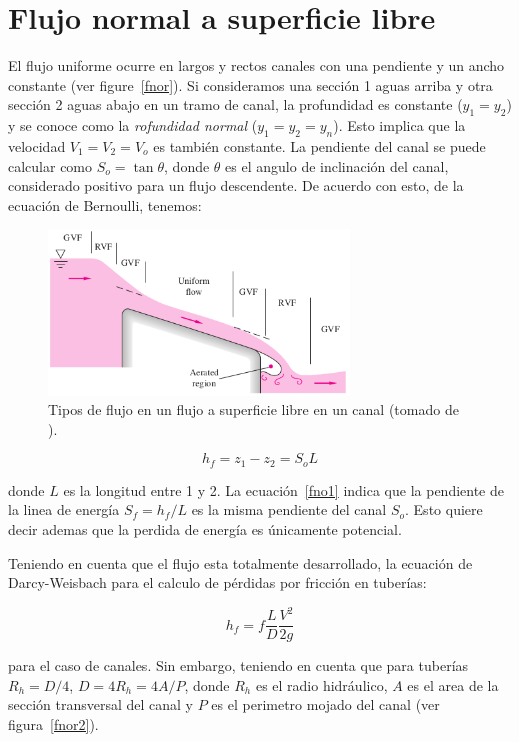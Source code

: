 \documentclass[11pt, oneside]{article}
\begin{document}
\section{Flujo normal a superficie libre}
El flujo uniforme ocurre en largos y rectos canales con una pendiente y un ancho constante (ver figure~\ref{fnor}). Si consideramos una secci\'on 1 aguas arriba y otra secci\'on 2 aguas abajo en un tramo de canal, la profundidad es constante ($y_1 = y_2$) y se conoce como la \emph{rofundidad normal} ($y_1 = y_2 = y_n$). Esto implica que la velocidad $V_1 = V_2 = V_o$ es tambi\'en constante. La pendiente del canal se puede calcular como $S_o = \tan \theta$, donde $\theta$ es el angulo de inclinaci\'on del canal, considerado positivo para un flujo descendente. De acuerdo con esto, de la ecuaci\'on de Bernoulli, tenemos:

\begin{figure}[h]
\centering
\includegraphics[width=8cm]{fnor1.png}
\caption{Tipos de flujo en un flujo a superficie libre en un canal (tomado de \cite{white1990fluid}).}
\label{fnor1}
\end{figure}

\begin{equation}
h_f = z_1 - z_2 = S_o L
\label{fno1}
\end{equation}

donde $L$ es la longitud entre 1 y 2. La ecuaci\'on~\ref{fno1} indica que la pendiente de la linea de energ\'ia $S_f = h_f /L$ es la misma pendiente del canal $S_o$. Esto quiere decir ademas que la perdida de energ\'ia es \'unicamente potencial. 

Teniendo en cuenta que el flujo esta totalmente desarrollado, la ecuaci\'on de Darcy-Weisbach para el calculo de p\'erdidas por fricci\'on en tuber\'ias:

\begin{equation}
h_f = f \frac{L}{D}\frac{V^2}{2g}
\label{fno2}
\end{equation}

para el caso de canales. Sin embargo, teniendo en cuenta que para tuber\'ias $R_h =D/4$, $D = 4R_h = 4A/P$, donde $R_h$ es el radio hidr\'aulico, $A$ es el area de la secci\'on transversal del canal y $P$ es el perimetro mojado del canal (ver figura~\ref{fnor2}).
\end{document}
